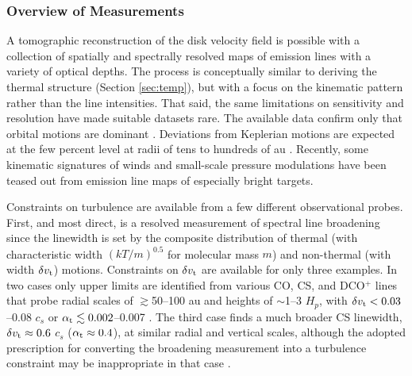 \documentclass[a4paper]{ar-1col}
\begin{document}
\subsubsection{Overview of Measurements}
A tomographic reconstruction of the disk velocity field is possible with a collection of spatially and spectrally resolved maps of emission lines with a variety of optical depths.  The process is conceptually similar to deriving the thermal structure (Section \ref{sec:temp}), but with a focus on the kinematic pattern rather than the line intensities.  That said, the same limitations on sensitivity and resolution have made suitable datasets rare.  The available data confirm only that orbital motions are dominant \citep{simon00,msimon17,rosenfeld12,czekala15,czekala16}.  Deviations from Keplerian motions are expected at the few percent level at radii of tens to hundreds of au \citep{rosenfeld13a}.  Recently, some kinematic signatures of winds \citep[e.g.,][]{guedel18} and small-scale pressure modulations \citep{yen16,teague18a,teague18b,pinte18b} have been teased out from emission line maps of especially bright targets.  

Constraints on turbulence are available from a few different observational probes.  First, and most direct, is a resolved measurement of spectral line broadening since the linewidth is set by the composite distribution of thermal (with characteristic width $(k T / m)^{0.5}$ for molecular mass $m$) and non-thermal (with width $\delta v_{\rm t}$) motions.  Constraints on $\delta v_{\rm t}$ are available for only three examples.  In two cases only upper limits are identified from various CO, CS, and DCO$^+$ lines that probe radial scales of $\gtrsim$50--100 au and heights of $\sim$1--3 $H_p$, with $\delta v_{\rm t} < 0.03$--0.08 $c_s$ or $\alpha_{\rm t} \lesssim 0.002$--0.007 \citep{hughes11,flaherty15,flaherty17,flaherty18,teague18a}.  The third case finds a much broader CS linewidth, $\delta v_{\rm t} \approx 0.6$ $c_s$ ($\alpha_{\rm t} \approx 0.4$), at similar radial and vertical scales, although the adopted prescription for converting the broadening measurement into a turbulence constraint may be inappropriate in that case \citep{guilloteau12}.   

\end{document}
